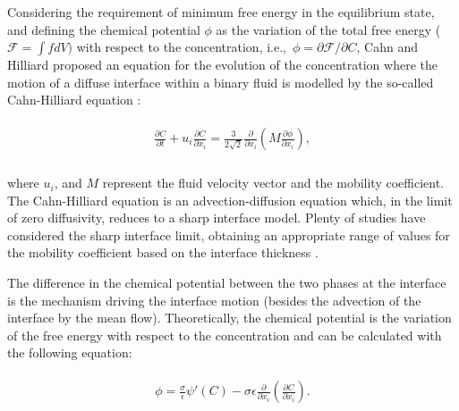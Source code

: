 \documentclass[review]{elsarticle}
\begin{document}
Considering the requirement of minimum free energy in the equilibrium state, and defining the chemical potential $\phi$ as the variation of the total free energy ($ \mathscr{F}=\int{f}dV)$ with respect to the concentration, i.e.,~$\phi =\partial \mathscr{F}/\partial C$, Cahn and Hilliard proposed an equation for the evolution of the concentration where the motion of a diffuse interface within a binary fluid is modelled by the so-called Cahn-Hilliard equation \citep{CahnHilliard1958,Cahn1961}:
\begin{linenomath}\begin{equation} \label{Cahn-Hilliard}
\begin{aligned}
\begin{gathered}
\frac{\partial C}{\partial t} + u_i \frac{\partial C}{\partial x_i} = \frac{3}{2 \sqrt 2} \frac{\partial }{\partial x_i}  \left(   M  \frac{\partial \phi}{\partial x_i}  \right) ,\\
\end{gathered}
\end{aligned}
\end{equation}\end{linenomath}
where  $u_i$, and $M$ represent the fluid velocity vector and the mobility coefficient. The Cahn-Hilliard equation is an advection-diffusion equation which, in the limit of zero diffusivity, reduces to  a sharp interface model. Plenty of studies have considered the sharp interface limit, obtaining an appropriate range of values for the mobility coefficient based on the interface thickness \citep{Magaletti, Xu2018}.

The difference in the chemical potential between the two phases at the interface is the mechanism driving the interface motion (besides the advection of the interface by the mean flow). Theoretically, the chemical potential is the variation of the free energy with respect to the concentration and can be calculated with the following equation:
   \begin{linenomath}\begin{equation} \label{Chemical-Potential}
 \begin{aligned}
\begin{gathered}
 \phi =  \frac{\sigma}{\epsilon} {\psi}'(C) -\sigma \epsilon  \frac{\partial }{\partial x_i}  \left( \frac{\partial C}{\partial x_i} \right) .
 \end{gathered}
\end{aligned}
\end{equation}\end{linenomath}
\end{document}
